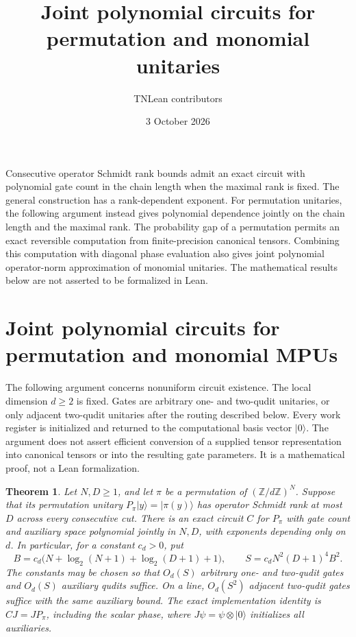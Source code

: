 \documentclass[11pt]{article}
\title{Joint polynomial circuits for permutation and monomial unitaries}
\author{TNLean contributors}
\date{3 October 2026}
\newtheorem{theorem}{Theorem}
\begin{document}
\maketitle

Consecutive operator Schmidt rank bounds admit an exact circuit with
polynomial gate count in the chain length when the maximal rank is fixed.
The general construction has a rank-dependent exponent. For permutation
unitaries, the following argument instead gives polynomial dependence
jointly on the chain length and the maximal rank. The probability gap of
a permutation permits an exact reversible computation from finite-precision
canonical tensors. Combining this computation with diagonal phase evaluation
also gives joint polynomial operator-norm approximation of monomial unitaries.
The mathematical results below are not asserted to be formalized in Lean.

\section{Joint polynomial circuits for permutation and monomial MPUs}

The following argument concerns nonuniform circuit existence.
The local dimension $d\ge2$ is fixed. Gates are arbitrary one-
and two-qudit unitaries, or only adjacent two-qudit unitaries after
the routing described below. Every work register is initialized
and returned to the computational basis vector $|0\rangle$.
The argument does not assert efficient conversion of a supplied
tensor representation into canonical tensors or into the resulting
gate parameters. It is a mathematical proof, not a Lean
formalization.

\begin{theorem}\label{thm:joint-polynomial-permutation}
Let $N,D\ge1$, and let $\pi$ be a permutation of
$(\mathbb Z/d\mathbb Z)^N$. Suppose that its permutation unitary
$P_\pi|y\rangle=|\pi(y)\rangle$ has operator Schmidt rank at most
$D$ across every consecutive cut.
There is an exact circuit $C$ for $P_\pi$ with gate count and
auxiliary space polynomial jointly in $N,D$, with exponents
depending only on $d$. In particular, for a constant $c_d>0$, put
\[
 B=c_d\bigl(N+\log_2(N+1)+\log_2(D+1)+1\bigr),\qquad
 S=c_dN^2(D+1)^4B^2.
\]
The constants may be chosen so that $O_d(S)$ arbitrary one- and
two-qudit gates and $O_d(S)$ auxiliary qudits suffice.
On a line, $O_d(S^2)$ adjacent two-qudit gates suffice with the same
auxiliary bound. The exact implementation identity is
$CJ=JP_\pi$, including the scalar phase, where
$J\psi=\psi\otimes|0\rangle$ initializes all auxiliaries.
\end{theorem}
\end{document}
